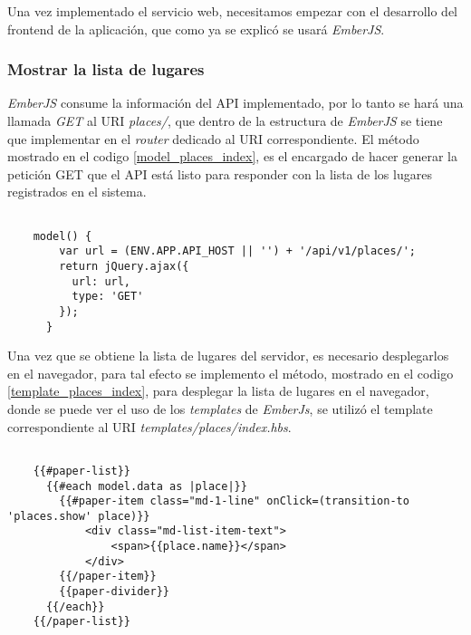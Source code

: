 Una vez implementado el servicio web, necesitamos empezar con el desarrollo del frontend de la aplicación, que como ya se explicó se usará \emph{EmberJS}. \\


\subsubsection{Mostrar la lista de lugares}


\emph{EmberJS} consume la información del API implementado, por lo tanto se hará una llamada \emph{GET} al URI \emph{places/}, que dentro de la estructura de \emph{EmberJS} se tiene que implementar en el \emph{router} dedicado al URI correspondiente. El método mostrado en el codigo \ref{model_places_index}, es el encargado de hacer generar la petición GET que el API está listo para responder con la lista de los lugares registrados en el sistema. \\

\begin{center}
  \begin{lstlisting}[label=model_places_index,caption=Método para obtener la lista de lugares del API]

    model() {
        var url = (ENV.APP.API_HOST || '') + '/api/v1/places/';
        return jQuery.ajax({
          url: url,
          type: 'GET'
        });
      }

  \end{lstlisting}
\end{center}

Una vez que se obtiene la lista de lugares del servidor, es necesario desplegarlos en el navegador, para tal efecto se implemento el método, mostrado en el codigo \ref{template_places_index}, para desplegar la lista de lugares en el navegador, donde se puede ver el uso de los \emph{templates} de \emph{EmberJs}, se utilizó el template correspondiente al URI \emph{templates/places/index.hbs}.

\begin{center}
  \begin{lstlisting}[label=template_places_index,caption=Template de la lista de lugares]

    {{#paper-list}}
      {{#each model.data as |place|}}
        {{#paper-item class="md-1-line" onClick=(transition-to 'places.show' place)}}
            <div class="md-list-item-text">
                <span>{{place.name}}</span>
            </div>
        {{/paper-item}}
        {{paper-divider}}
      {{/each}}
    {{/paper-list}}

  \end{lstlisting}
\end{center}

